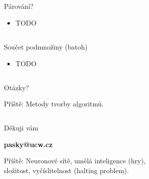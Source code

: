 \documentclass{beamer}
\begin{document}
\subsection{}
\begin{frame}{Párování?}
\begin{itemize}
\item TODO
\end{itemize}
\end{frame}

\subsection{}
\begin{frame}{Součet podmnožiny (batoh)}
\begin{itemize}
\item TODO
\end{itemize}
\end{frame}

\subsection{}
\begin{frame}{Otázky?}
\begin{center}
Příště: Metody tvorby algoritmů.
\end{center}
\end{frame}

\subsection{}
\begin{frame}{Děkuji vám}
\begin{center}
{\bf pasky@ucw.cz}

Příště: Neuronové sítě, umělá inteligence (hry), \\ složitost, vyčíslitelnost (halting problem).
\end{center}
\end{frame}
\end{document}
